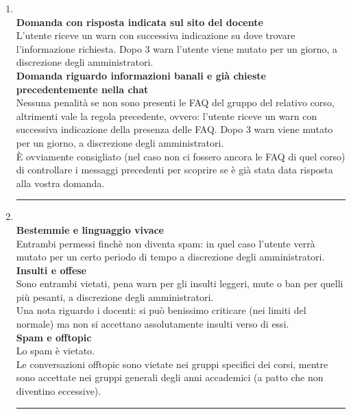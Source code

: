 \documentclass[a4paper, 11pt, oneside, article]{book} %
\begin{document}
\begin{enumerate}
\rmfamily
\item {}\\
	
	\textbf{Domanda con risposta indicata sul sito del docente}\\
	L'utente riceve un warn con successiva indicazione su dove trovare l'informazione richiesta.
	Dopo 3 warn l'utente viene mutato per un giorno, a discrezione degli amministratori.\\
	
	\textbf{Domanda riguardo informazioni banali e già chieste\\ precedentemente nella chat}\\
	Nessuna penalità se non sono presenti le FAQ del gruppo del relativo corso, altrimenti vale la regola precedente, ovvero: l'utente riceve un warn con successiva 					indicazione della presenza delle FAQ. Dopo 3 warn viene mutato per un giorno, a discrezione degli amministratori.\\
	È ovviamente consigliato (nel caso non ci fossero ancora le FAQ di quel corso) di controllare i messaggi precedenti per scoprire se è già stata data risposta alla vostra domanda.
	
\rule{\linewidth}{0.1mm}

\item  {}\\

	\textbf{Bestemmie e linguaggio vivace}\\
	Entrambi permessi finchè non diventa spam: in quel caso l'utente verrà mutato per un certo periodo di tempo a discrezione degli amministratori.\\
	
	\textbf{Insulti e offese}\\
	Sono entrambi vietati, pena warn per gli insulti leggeri, mute o ban per quelli più pesanti, a discrezione degli amministratori.\\
	Una nota riguardo i docenti: si può benissimo criticare (nei limiti del normale) ma non si accettano assolutamente insulti verso di essi.\\
	
	\textbf{Spam e offtopic}\\
	Lo spam è vietato.\\
	Le conversazioni offtopic sono vietate nei gruppi specifici dei corsi, mentre sono accettate nei gruppi generali degli anni accademici (a patto che non diventino eccessive).

\rule{\linewidth}{0.1mm}
	
\end{enumerate}
\end{document}
